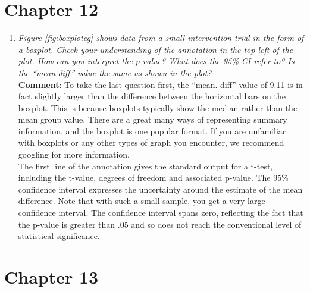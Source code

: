\documentclass{krantz}
\providecommand{\tightlist}{%
\setlength{\itemsep}{0pt}\setlength{\parskip}{0pt}}
\begin{document}
\hypertarget{chapter-12}{%
\section{Chapter 12}\label{chapter-12}}

\begin{enumerate}
\def\labelenumi{\arabic{enumi}.}
\tightlist
\item
  \emph{Figure \ref{fig:boxploteg} shows data from a small intervention trial in the form of a boxplot. Check your understanding of the annotation in the top left of the plot. How can you interpret the p-value? What does the 95\% CI refer to? Is the ``mean.diff'' value the same as shown in the plot?}\\
  \textbf{Comment}: To take the last question first, the ``mean. diff'' value of 9.11 is in fact slightly larger than the difference between the horizontal bars on the boxplot. This is because boxplots typically show the median rather than the mean group value. There are a great many ways of representing summary information, and the boxplot is one popular format. If you are unfamiliar with boxplots or any other types of graph you encounter, we recommend googling for more information.\\
  The first line of the annotation gives the standard output for a t-test, including the t-value, degrees of freedom and associated p-value. The 95\% confidence interval expresses the uncertainty around the estimate of the mean difference. Note that with such a small sample, you get a very large confidence interval. The confidence interval spans zero, reflecting the fact that the p-value is greater than .05 and so does not reach the conventional level of statistical significance.
\end{enumerate}

\hypertarget{chapter-13}{%
\section{Chapter 13}\label{chapter-13}}
\end{document}
